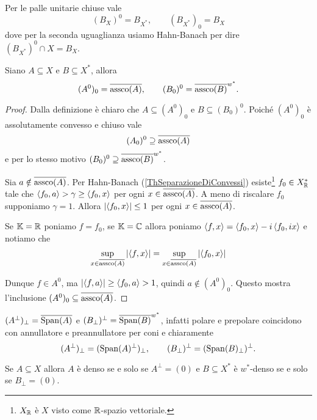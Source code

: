 \begin{remark}
Per le palle unitarie chiuse vale
\[(B_X)^0=B_{X^\ast},\qquad (B_{X^\ast})_0=B_X\]
dove per la seconda uguaglianza usiamo Hahn-Banach per dire $(B_{X^\ast})^0\cap X=B_X$.
\end{remark}

\begin{proposition}\label{PrPolarePrepolareIteratiDannoChiusuraAssolutamenteConvessa}
Siano $A\subseteq X$ e $B\subseteq X^\ast$, allora
\[(A^0)_0=\overline{\operatorname{assco}(A)},\qquad (B_0)^0=\overline{\operatorname{assco}(B)}^{w^\ast}.\]
\end{proposition}
\begin{proof}
Dalla definizione \`e chiaro che $A\subseteq (A^0)_0$ e $B\subseteq (B_0)^0$. Poich\'e $(A^0)_0$ \`e assolutamente convesso e chiuso vale
\[(A_0)^0\supseteq\overline{\operatorname{assco}(A)}\]
e per lo stesso motivo $(B_0)^0\supseteq \overline{\operatorname{assco}(B)}^{w^\ast}$.

Sia $a\notin \overline{\operatorname{assco}(A)}$. Per Hahn-Banach (\ref{ThSeparazioneDiConvessi}) esiste\footnote{$X_{\mathbb{R}}$ \`e $X$ visto come $\mathbb{R}$-spazio vettoriale.} $f_0\in X_{\mathbb{R}}^\ast$ tale che $\left\langle {f_0,a}\right\rangle>\gamma\geq \left\langle {f_0,x}\right\rangle$ per ogni $x\in \overline{\operatorname{assco}(A)}$. A meno di riscalare $f_0$ supponiamo $\gamma=1$. Allora $\left|{\left\langle {f_0,x}\right\rangle}\right|\leq 1$ per ogni $x\in \overline{\operatorname{assco}(A)}$. 

Se $\mathbb{K}=\mathbb{R}$ poniamo $f=f_0$, se $\mathbb{K}=\mathbb{C}$ allora poniamo $\left\langle {f,x}\right\rangle=\left\langle {f_0,x}\right\rangle-i\left\langle {f_0,ix}\right\rangle$ e notiamo che
\[\sup_{x\in\overline{\operatorname{assco}(A)}}\left|{\left\langle {f,x}\right\rangle}\right|=\sup_{x\in\overline{\operatorname{assco}(A)}}\left|{\left\langle {f_0,x}\right\rangle}\right|\]

Dunque $f\in A^0$, ma $\left|{\left\langle {f,a}\right\rangle}\right|\geq \left\langle {f_0,a}\right\rangle>1$, quindi $a\notin (A^0)_0$. Questo mostra l'inclusione $(A^0)_0\subseteq \overline{\operatorname{assco}(A)}$.
\end{proof}

\begin{remark}
$(A^\perp)_\perp=\overline{\operatorname{Span}(A)}$ e $(B_\perp)^\perp=\overline{\operatorname{Span}(B)}^{w^\ast}$, infatti polare e prepolare coincidono con annullatore e preannullatore per coni e chiaramente 
\[(A^\perp)_\perp=(\operatorname{Span}(A)^\perp)_\perp,\qquad (B_\perp)^\perp=(\operatorname{Span}(B)_\perp)^\perp.\]
\end{remark}

\begin{remark}
Se $A\subseteq X$ allora $A$ \`e denso se e solo se $A^\perp=(0)$ e $B\subseteq X^\ast$ \`e $w^\ast$-denso se e solo se $B_\perp=(0)$.
\end{remark}

